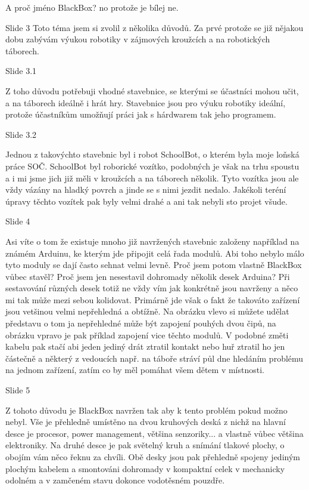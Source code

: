 A proč jméno BlackBox? no protože je bílej ne.


Slide 3 
Toto téma jsem si zvolil z několika důvodů. Za prvé protože se již nějakou dobu zabývám 
výukou robotiky v zájmových kroužcích a na robotických táborech. 

    Slide 3.1

    Z toho důvodu potřebuji 
    vhodné stavebnice, se kterými se účastníci mohou učit, a na táborech ideálně i hrát hry.
    Stavebnice jsou pro výuku robotiky ideální, protože účastníkům umožňují práci jak 
    s hárdwarem tak jeho programem.

    Slide 3.2

    Jednou z takovýchto stavebnic byl i robot SchoolBot, o kterém byla moje loňská práce SOČ.
    SchoolBot byl roborické vozítko, podobných je však na trhu spoustu a i mi jsme jich již měli v kroužcích
    a na táborech několik. Tyto vozítka jsou ale vždy vázány na hladký povrch a jinde se s nimi jezdit nedalo.
    Jakékoli teréní úpravy těchto vozítek pak byly velmi drahé a ani tak nebyli sto projet všude.


Slide 4

Asi víte o tom že existuje mnoho již navržených stavebnic založeny například na známém Arduinu, 
ke kterým jde připojit celá řada modulů. Abi toho nebylo málo tyto moduly se dají často sehnat velmi levně. 
Proč jsem potom vlastně BlackBox vůbec stavěl? Proč jsem jen nesestavil dohromady několik desek Arduina? 
Při sestavování různých desek
totiž ne vždy vím jak konkrétně jsou navrženy a něco mi tak může mezi sebou kolidovat.
Primárně jde však o fakt že takováto zařízení jsou vetšinou velmi nepřehledná a obtížně.
Na obrázku vlevo si můžete udělat představu o tom ja nepřehledné může být zapojení pouhých dvou čipů, 
na obrázku vpravo je pak příklad zapojení vice těchto modulů. V podobné změti kabelu pak stačí abi jeden jediný drát 
ztratil kontakt nebo huř ztratil ho jen částečně a některý z vedoucích např. na táboře stráví půl dne hledáním problému 
na jednom zařízení, zatím co by měl pomáhat všem dětem v místnosti.


Slide 5

Z tohoto důvodu je BlackBox navržen tak aby k tento problém pokud možno nebyl. 
Vše je přehledně umístěno na dvou kruhových deská z nichž na hlavní desce je procesor, power management, většina
senzoriky... a vlastně vůbec většina elektroniky. Na druhé desce je pak světelný kruh a snímání tlakové plochy, 
o obojím vám něco řeknu za chvíli.
Obě desky jsou pak přehledně spojeny jediným plochým kabelem a smontováni dohromady v kompaktní celek 
v mechanicky odolném a v zamčeném stavu dokonce vodotěsném pouzdře. %

